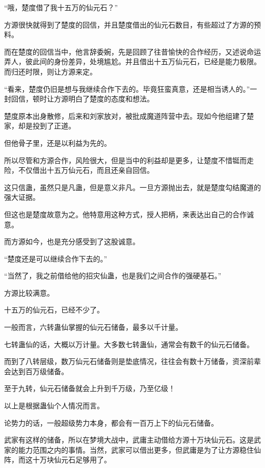
\begin{this_body}

“哦，楚度借了我十五万的仙元石？”

方源很快就得到了楚度的回信，并且楚度借出的仙元石数目，有些超过了方源的预料。

而在楚度的回信当中，他言辞委婉，先是回顾了往昔愉快的合作经历，又述说命运弄人，彼此间的身份差异，处境尴尬。并且借出十五万仙元石，已经是能力极限。而归还时限，则让方源来定。

“看来，楚度仍旧是想与我继续合作下去的。毕竟狂蛮真意，还是相当诱人的。”一封回信，顿时让方源明白了楚度的态度和想法。

楚度原本出身散修，后来和刘家放对，被批成魔道阵营中去。现如今他组建了楚家，却是投到了正道。

但他骨子里，还是以利益为先的。

所以尽管和方源合作，风险很大，但是当中的利益却是更多，让楚度不惜铤而走险，不仅借出十五万仙元石，而且还亲自回信。

这只信蛊，虽然只是凡蛊，但是意义非凡。一旦方源抛出去，就是楚度勾结魔道的强大证据。

但这也是楚度故意为之。他特意用这种方式，授人把柄，来表达出自己的合作诚意。

而方源如今，也是充分感受到了这股诚意。

“楚度还是可以继续合作下去的。”

“当然了，我之前借给他的招灾仙蛊，也是我们之间合作的强硬基石。”

方源比较满意。

十五万的仙元石，已经不少了。

一般而言，六转蛊仙掌握的仙元石储备，最多以千计量。

七转蛊仙的话，大概以万计量。大多数七转蛊仙，通常会有数千的仙元石储备。

而到了八转层级，数万仙元石储备则是垫底情况，往往会有数十万储备，资深前辈会达到百万级储备。

至于九转，仙元石储备就会上升到千万级，乃至亿级！

以上是根据蛊仙个人情况而言。

论势力的话，一般超级势力本身，都会有一百万上下的仙元石储备。

武家有这样的储备，所以在梦境大战中，武庸主动借给方源十万块仙元石。这是武家的能力范围之内的事情。当然，武家可以借出更多，但武庸是为了让方源稳住仙阵，而这十万块仙元石足够用了。


\end{this_body}

